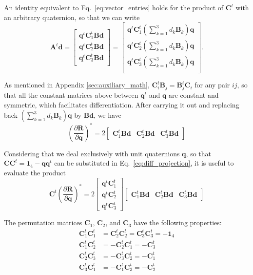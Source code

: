 \documentclass[aip,jcp,reprint,amsmath,amssymb,raggedbottom]{revtex4-1}
\newcommand{\mt}[1]{\boldsymbol{\mathbf{#1}}}           %
\newcommand{\vt}[1]{\boldsymbol{\mathbf{#1}}}           %
\newcommand{\tr}[1]{#1^t}                               %
\newcommand{\diff}[2]{\dfrac{\partial #1}{\partial #2}} %
\begin{document}
An identity equivalent to Eq.~\ref{eq:vector_entries} holds for the product of $\tr{\mt C}$ with an arbitrary quaternion, so that we can write
\[
\tr{\mt A}{\vt d} =
\left[\begin{array}{c}
\tr{\vt q}\tr{\mt C}_1 \mt B \vt d \\
\tr{\vt q}\tr{\mt C}_2 \mt B \vt d \\
\tr{\vt q}\tr{\mt C}_3 \mt B \vt d \\
\end{array}\right] = 
\left[\begin{array}{c}
\tr{\vt q} \tr{\mt C}_1 \left( \sum_{k=1}^3 d_k \mt B_k \right) \vt q \\
\tr{\vt q} \tr{\mt C}_2 \left( \sum_{k=1}^3 d_k \mt B_k \right) \vt q \\
\tr{\vt q} \tr{\mt C}_3 \left( \sum_{k=1}^3 d_k \mt B_k \right) \vt q \\
\end{array}\right].
\]

As mentioned in Appendix \ref{sec:auxiliary_math}, $\tr{\mt C}_i \mt B_j = \tr{\mt B}_j \mt C_i$ for any pair $ij$, so that all the constant matrices above between $\tr{\vt q}$ and $\vt q$ are constant and symmetric, which facilitates differentiation. After carrying it out and replacing back $(\sum_{k=1}^3 d_k \mt B_k) \vt q$ by $\mt B \vt d$, we have
\[
\left( \diff{\vt R}{\vt q} \right)^\ast = 2 \left[\begin{array}{ccc}
\tr{\mt C}_1 \mt B \vt d & \tr{\mt C}_2 \mt B \vt d & \tr{\mt C}_3 \mt B \vt d
\end{array}\right]
\]

Considering that we deal exclusively with unit quaternions $\vt q$, so that $\mt C \tr{\mt C} = \mt 1_4 - \vt q \tr{\vt q}$ can be substituted in Eq.~\ref{eq:diff_projection}, it is useful to evaluate the product
\[
\tr{\mt C} \left( \diff{\vt R}{\vt q} \right)^\ast = 2 \left[\begin{array}{c}
\tr{\vt q}\tr{\mt C_1} \\
\tr{\vt q}\tr{\mt C_2} \\
\tr{\vt q}\tr{\mt C_3}
\end{array}\right] \left[\begin{array}{ccc}
\tr{\mt C}_1 \mt B \vt d & \tr{\mt C}_2 \mt B \vt d & \tr{\mt C}_3 \mt B \vt d
\end{array}\right]
\]

The permutation matrices $\mt C_1$, $\mt C_2$, and $\mt C_3$ have the following properties:
\begin{equation}
\begin{aligned}
\tr{\mt C_1}\tr{\mt C_1} &= \tr{\mt C_2}\tr{\mt C_2} = \tr{\mt C_3}\tr{\mt C_3} = -\mt 1_4 \\
\tr{\mt C_1}\tr{\mt C_2} &= -\tr{\mt C_2}\tr{\mt C_1} = -\tr{\mt C_3} \\
\tr{\mt C_2}\tr{\mt C_3} &= -\tr{\mt C_3}\tr{\mt C_2} = -\tr{\mt C_1} \\
\tr{\mt C_3}\tr{\mt C_1} &= -\tr{\mt C_1}\tr{\mt C_3} = -\tr{\mt C_2}
\end{aligned}
\end{equation}
\end{document}
